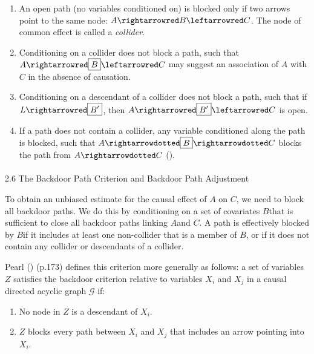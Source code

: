 \documentclass[
  single column]{article}
\makeatletter
\let\oldparagraph\paragraph
\renewcommand{\paragraph}{
    \@ifstar
      \xxxParagraphStar
      \xxxParagraphNoStar
  }
\newcommand{\xxxParagraphStar}[1]{\oldparagraph*{#1}\mbox{}}
\newcommand{\xxxParagraphNoStar}[1]{\oldparagraph{#1}\mbox{}}
\providecommand{\tightlist}{%
  \setlength{\itemsep}{0pt}\setlength{\parskip}{0pt}}\usepackage{longtable,booktabs,array}
\makeatother
\begin{document}
\begin{enumerate}
\def\labelenumi{\arabic{enumi}.}
\tightlist
\item
  An open path (no variables conditioned on) is blocked only if two
  arrows point to the same node: \(A \rightarrowred B \leftarrowred C\).
  The node of common effect is called a \emph{collider}.
\item
  Conditioning on a collider does not block a path, such that
  \(A \rightarrowred \boxed{B} \leftarrowred C\) may suggest an
  association of \(A\) with \(C\) in the absence of causation.
\item
  Conditioning on a descendant of a collider does not block a path, such
  that if \(L \rightarrowred \boxed{B'}\), then
  \(A \rightarrowred \boxed{B'} \leftarrowred C\) is open.
\item
  If a path does not contain a collider, any variable conditioned along
  the path is blocked, such that
  \(A \rightarrowdotted \boxed{B} \rightarrowdotted C\) blocks the path
  from \(A \rightarrowdotted C\) ().
\end{enumerate}

\paragraph{2.6 The Backdoor Path Criterion and Backdoor Path
Adjustment}\label{the-backdoor-path-criterion-and-backdoor-path-adjustment}

To obtain an unbiased estimate for the causal effect of \(A\) on \(C\),
we need to block all backdoor paths. We do this by conditioning on a set
of covariates \(B\)that is sufficient to close all backdoor paths
linking \(A\)and \(C\). A path is effectively blocked by \(B\)if it
includes at least one non-collider that is a member of \(B\), or if it
does not contain any collider or descendants of a collider.

Pearl () (p.173) defines this criterion
more generally as follows: a set of variables \(Z\) satisfies the
backdoor criterion relative to variables \(X_i\) and \(X_j\) in a causal
directed acyclic graph \(\mathcal{G}\) if:

\begin{enumerate}
\def\labelenumi{\arabic{enumi}.}
\tightlist
\item
  No node in \(Z\) is a descendant of \(X_i\).
\item
  \(Z\) blocks every path between \(X_i\) and \(X_j\) that includes an
  arrow pointing into \(X_i\).
\end{enumerate}
\end{document}
